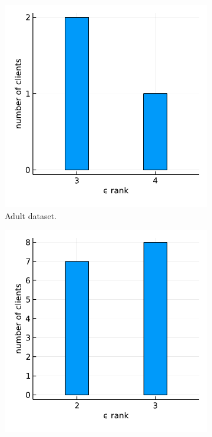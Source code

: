 \begin{figure}[t]
    \begin{subfigure}{.24\textwidth}
      \centering
      \includegraphics[width=\linewidth]{./figures/syn_embedding_matrix_adult.pdf}
      \caption{Adult dataset.}
      \label{fig:syn_embedding_matrix_adult}
    \end{subfigure}%
    \begin{subfigure}{.24\textwidth}
      \centering
      \includegraphics[width=\linewidth]{./figures/syn_embedding_matrix_web.pdf}

\end{subfigure}
\end{figure}
